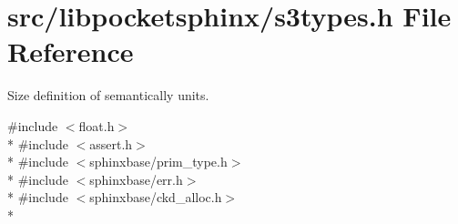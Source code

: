 \section{src/libpocketsphinx/s3types.h File Reference}
\label{s3types_8h}


Size definition of semantically units.  


{\ttfamily \#include $<$float.\+h$>$}\\*
{\ttfamily \#include $<$assert.\+h$>$}\\*
{\ttfamily \#include $<$sphinxbase/prim\+\_\+type.\+h$>$}\\*
{\ttfamily \#include $<$sphinxbase/err.\+h$>$}\\*
{\ttfamily \#include $<$sphinxbase/ckd\+\_\+alloc.\+h$>$}\\*
